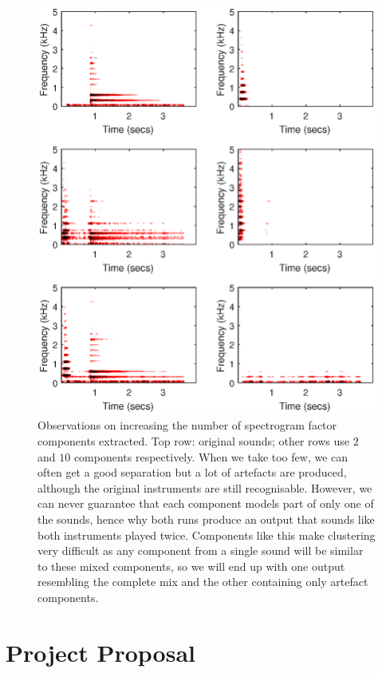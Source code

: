 \documentclass[12pt,a4paper,twoside,openright]{report}
\begin{document}

\begin{figure}
\centering
\includegraphics[width=0.7\linewidth]{../OutputSpectrograms/elementCountNMFSpec}
\caption[Observations on increasing the number of spectrogram factor components extracted.]{Observations on increasing the number of spectrogram factor components extracted. Top row: original sounds; other rows use $ 2 $ and $ 10 $ components respectively. When we take too few, we can often get a good separation but a lot of artefacts are produced, although the original instruments are still recognisable. However, we can never guarantee that each component models part of only one of the sounds, hence why both runs produce an output that sounds like both instruments played twice. Components like this make clustering very difficult as any component from a single sound will be similar to these mixed components, so we will end up with one output resembling the complete mix and the other containing only artefact components.}
\label{fig:elementCountNMFSpec}
\end{figure}

\chapter{Project Proposal}


\parindent 0pt
\parskip 6pt

\medskip
{}
\medskip
{}
\end{document}
